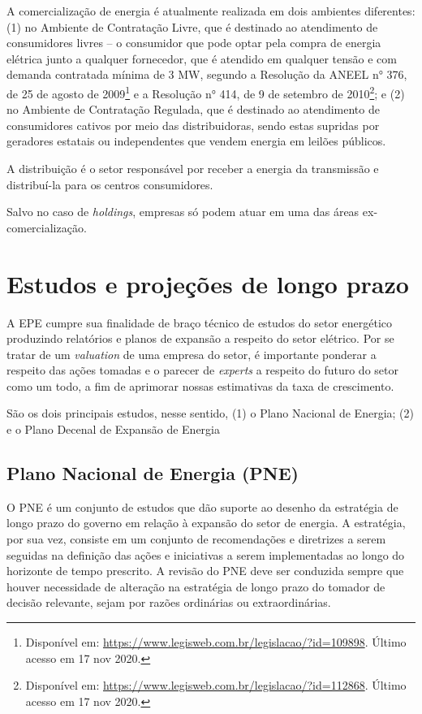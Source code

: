 \documentclass[aprovado,numbers]{coppe}
\begin{document}
  A comercialização de energia é atualmente realizada em dois ambientes diferentes: (1) no Ambiente de Contratação Livre, que é destinado ao atendimento de consumidores livres -- o consumidor que pode optar pela compra de energia elétrica junto a qualquer fornecedor, que é atendido em qualquer tensão e com demanda contratada mínima de 3 MW, segundo a Resolução da ANEEL n° 376, de 25 de agosto de 2009\footnote{Disponível em: \url{https://www.legisweb.com.br/legislacao/?id=109898}. Último acesso em 17 nov 2020.} e a Resolução n° 414, de 9 de setembro de 2010\footnote{Disponível em: \url{https://www.legisweb.com.br/legislacao/?id=112868}. Último acesso em 17 nov 2020.}; e (2) no Ambiente de Contratação Regulada, que é destinado ao atendimento de consumidores cativos por meio das distribuidoras, sendo estas supridas por geradores estatais ou independentes que vendem energia em leilões públicos.

  A distribuição é o setor responsável por receber a energia da transmissão e distribuí-la para os centros consumidores.

  Salvo no caso de \emph{holdings}, empresas só podem atuar em uma das áreas ex-comercialização.

  \hypertarget{estudos-e-projeuxe7uxf5es-de-longo-prazo}{%
  \section{Estudos e projeções de longo prazo}\label{estudos-e-projeuxe7uxf5es-de-longo-prazo}}

  A EPE cumpre sua finalidade de braço técnico de estudos do setor energético produzindo relatórios e planos de expansão a respeito do setor elétrico. Por se tratar de um \emph{valuation} de uma empresa do setor, é importante ponderar a respeito das ações tomadas e o parecer de \emph{experts} a respeito do futuro do setor como um todo, a fim de aprimorar nossas estimativas da taxa de crescimento.

  São os dois principais estudos, nesse sentido, (1) o Plano Nacional de Energia; (2) e o Plano Decenal de Expansão de Energia

  \hypertarget{plano-nacional-de-energia-pne}{%
  \subsection{Plano Nacional de Energia (PNE)}\label{plano-nacional-de-energia-pne}}

  O PNE é um conjunto de estudos que dão suporte ao desenho da estratégia de longo prazo do governo em relação à expansão do setor de energia. A estratégia, por sua vez, consiste em um conjunto de recomendações e diretrizes a serem seguidas na definição das ações e iniciativas a serem implementadas ao longo do horizonte de tempo prescrito. A revisão do PNE deve ser conduzida sempre que houver necessidade de alteração na estratégia de longo prazo do tomador de decisão relevante, sejam por razões ordinárias ou extraordinárias.
\end{document}
